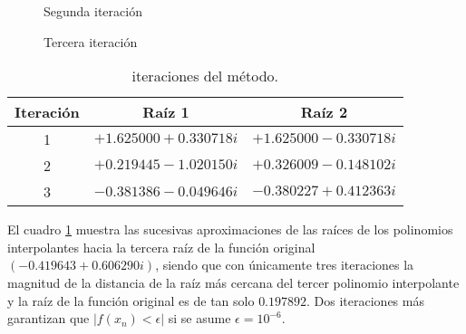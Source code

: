 \begin{figure}
    \centering
    \caption{Segunda iteración}
    \label{second_poly}
\end{figure}
\begin{figure}
    \centering
    \caption{Tercera iteración}
    \label{third_poly}
\end{figure}
\begin{table}[h!]
    \centering
    \caption{iteraciones del método.}
    \label{iterations_table}
    \begin{tabular}{c|c|c}
        \textbf{Iteración} & \textbf{Raíz 1} & \textbf{Raíz 2}\\
        \hline
        1 & $+1.625000+0.330718i$ & $+1.625000-0.330718i$\\
        2 & $+0.219445-1.020150i$ & $+0.326009-0.148102i$\\
        3 & $-0.381386-0.049646i$ & $-0.380227+0.412363i$\\
    \end{tabular}
\end{table}
\newpage
El cuadro \ref{iterations_table} muestra las sucesivas aproximaciones de las raíces de los polinomios interpolantes
hacia la tercera raíz de la función original $(-0.419643+0.606290i)$, siendo que con únicamente tres iteraciones la
magnitud de la distancia de la raíz más cercana del tercer polinomio interpolante y la raíz de la función original es
de tan solo $0.197892$. Dos iteraciones más garantizan que $|f(x_n)<\epsilon|$ si se asume $\epsilon=10^{-6}$.